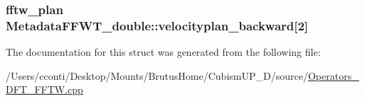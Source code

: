 \subsubsection[{velocityplan\+\_\+backward}]{\setlength{\rightskip}{0pt plus 5cm}fftw\+\_\+plan Metadata\+F\+F\+W\+T\+\_\+double\+::velocityplan\+\_\+backward\mbox{[}2\mbox{]}}\label{struct_metadata_f_f_w_t__double_ade6f127e609361c0c5a785a661c94fd5}


The documentation for this struct was generated from the following file\+:\begin{DoxyCompactItemize}
\item 
/\+Users/cconti/\+Desktop/\+Mounts/\+Brutus\+Home/\+Cubism\+U\+P\+\_\+D/source/\hyperlink{_operators___d_f_t___f_f_t_w_8cpp}{Operators\+\_\+\+D\+F\+T\+\_\+\+F\+F\+T\+W.\+cpp}\end{DoxyCompactItemize}
